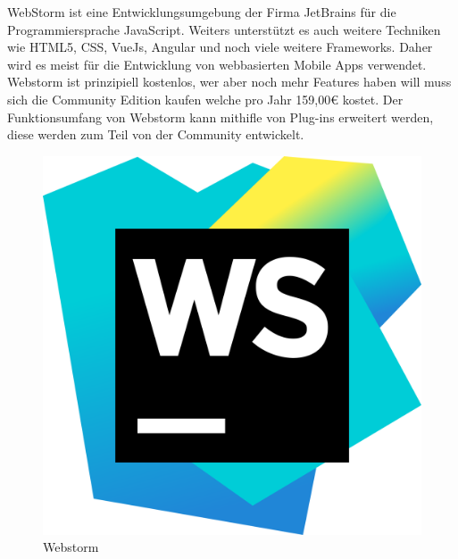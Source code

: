 WebStorm ist eine Entwicklungsumgebung der Firma JetBrains für die Programmiersprache JavaScript. Weiters unterstützt es auch weitere Techniken wie HTML5, CSS, VueJs, Angular und noch viele weitere Frameworks. Daher wird es meist für die Entwicklung von webbasierten Mobile Apps verwendet.
Webstorm ist prinzipiell kostenlos, wer aber noch mehr Features haben will muss sich die Community Edition kaufen welche pro Jahr 159,00€ kostet.
Der Funktionsumfang von Webstorm kann mithifle von Plug-ins erweitert werden, diese werden zum Teil von der Community entwickelt.

\begin{figure}[h!]
    \centering
    \includegraphics[width=0.3\linewidth]{pics/WebStorm_Icon.png}
    \caption{Webstorm}
    \label{fig:enter-label}
\end{figure}

\cite{Webstorm}



